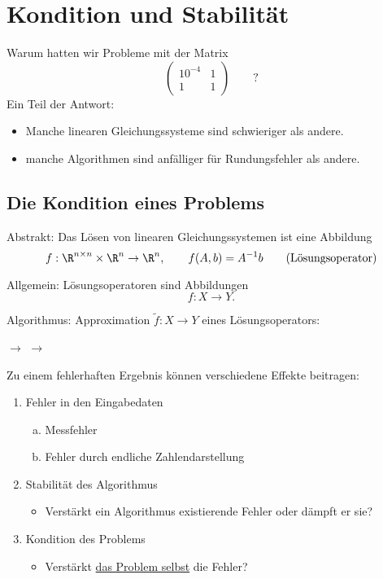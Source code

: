 \chapter{Kondition und Stabilität}
Warum hatten wir Probleme mit der Matrix
\begin{equation*}
\begin{pmatrix}
10^{-4} & 1
\\ 1 & 1
\end{pmatrix}
\hspace{2em}
?
\end{equation*}
Ein Teil der Antwort:
\begin{itemize}
\item Manche linearen Gleichungssysteme sind schwieriger als andere.
\item manche Algorithmen sind anfälliger für Rundungsfehler als andere.
\end{itemize}

\section{Die Kondition eines Problems}

Abstrakt: Das Lösen von linearen Gleichungssystemen ist eine Abbildung
\begin{equation*}
f: \R ^{n \times n} \times \R^n \to \R^n, \qquad f(A,b) = A^{-1}b \qquad \text{(Lösungsoperator)}
\end{equation*}

\medskip

Allgemein: Lösungsoperatoren sind Abbildungen
\begin{equation*}
f: X \to Y.
\end{equation*}

\medskip

Algorithmus: Approximation $\tilde{f} : X \to Y$ eines Lösungsoperators:
\medskip
\begin{center}
 $\rightarrow$  $\rightarrow$ 
\end{center}

\medskip

Zu einem fehlerhaften Ergebnis können verschiedene Effekte beitragen:
\begin{enumerate}[1)]
\item Fehler in den Eingabedaten
\begin{enumerate}[a)]
\item Messfehler
\item Fehler durch endliche Zahlendarstellung
\end{enumerate}
\item Stabilität des Algorithmus
\begin{itemize}
\item Verstärkt ein Algorithmus existierende Fehler oder dämpft er sie?
\end{itemize}
\item Kondition des Problems
\begin{itemize}
\item Verstärkt \underline{das Problem selbst} die Fehler?
\end{itemize}
\end{enumerate}

